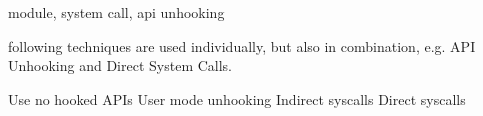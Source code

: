 


module, system call, api unhooking

 following techniques are used individually, but also in combination, e.g. API Unhooking and Direct System Calls.

Use no hooked APIs
User mode unhooking
Indirect syscalls
Direct syscalls